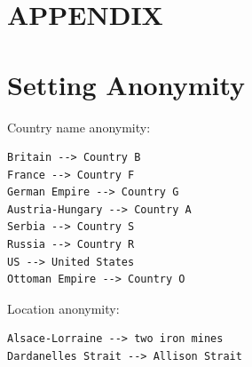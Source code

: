 \documentclass{article}
\begin{document}




\newpage
\appendix
\section*{APPENDIX}

\section{Setting Anonymity}
\label{anonymization}
Country name anonymity:
\begin{lstlisting}[language=HTML]
Britain --> Country B
France --> Country F
German Empire --> Country G
Austria-Hungary --> Country A
Serbia --> Country S 
Russia --> Country R 
US --> United States 
Ottoman Empire --> Country O
\end{lstlisting}

Location anonymity:
\begin{lstlisting}[language=HTML]
Alsace-Lorraine --> two iron mines
Dardanelles Strait --> Allison Strait
\end{lstlisting}
\end{document}
